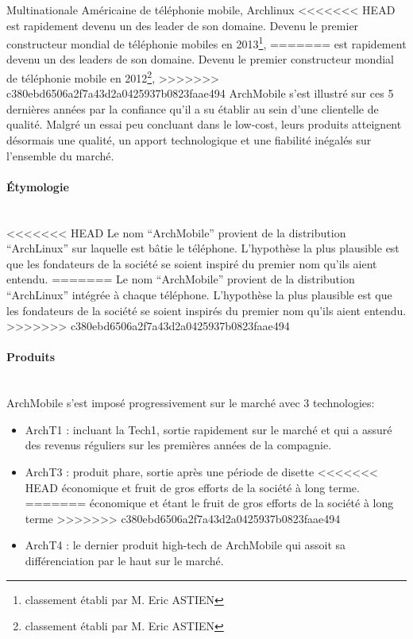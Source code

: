 Multinationale Américaine de téléphonie mobile, Archlinux 
<<<<<<< HEAD
est rapidement devenu un des leader de son domaine.
Devenu le premier constructeur mondial de téléphonie mobiles 
en 2013\footnote{classement établi par M. Eric ASTIEN},
=======
est rapidement devenu un des leaders de son domaine.
Devenu le premier constructeur mondial de téléphonie mobile 
en 2012\footnote{classement établi par M. Eric ASTIEN},
>>>>>>> c380ebd6506a2f7a43d2a0425937b0823faae494
ArchMobile s'est illustré sur ces 5 dernières années par
la confiance qu'il a su établir au sein d'une clientelle 
de qualité. Malgré un essai peu concluant dans le low-cost,
leurs produits atteignent désormais une qualité, un apport
technologique et une fiabilité inégalés sur l'ensemble du
marché.



\paragraph{\'Etymologie}~\\
<<<<<<< HEAD
Le nom ``ArchMobile'' provient de la distribution ``ArchLinux'' sur
laquelle est bâtie le téléphone. L'hypothèse la plus plausible est que
les fondateurs de la société se soient inspiré du premier nom qu'ils
aient entendu. 
=======
Le nom ``ArchMobile'' provient de la distribution ``ArchLinux''
intégrée à  chaque téléphone. L'hypothèse la plus plausible
est que les fondateurs de la société se soient inspirés du premier
nom qu'ils aient entendu.
>>>>>>> c380ebd6506a2f7a43d2a0425937b0823faae494

\paragraph{Produits}~\\
ArchMobile s'est imposé progressivement sur le marché avec 3 technologies:
\begin{itemize}
\item ArchT1 : incluant la Tech1, sortie rapidement sur le marché et qui a assuré 
  des revenus réguliers sur les premières années de la compagnie.
\item ArchT3 : produit phare, sortie après une période de disette 
<<<<<<< HEAD
  économique et fruit de gros efforts de la société à long terme.
=======
  économique et étant le fruit de gros efforts de la société à long terme
>>>>>>> c380ebd6506a2f7a43d2a0425937b0823faae494
\item ArchT4 : le dernier produit high-tech de ArchMobile qui assoit
  sa différenciation par le haut sur le marché.
\end{itemize}

